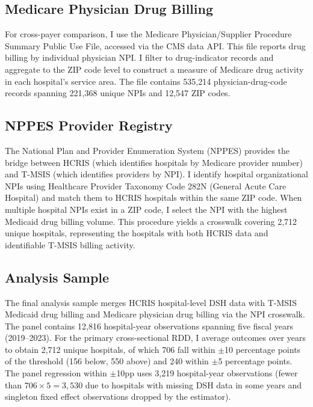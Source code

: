 \documentclass[12pt]{article}
\begin{document}
\subsection{Medicare Physician Drug Billing}

For cross-payer comparison, I use the Medicare Physician/Supplier Procedure Summary Public Use File, accessed via the CMS data API. This file reports drug billing by individual physician NPI. I filter to drug-indicator records and aggregate to the ZIP code level to construct a measure of Medicare drug activity in each hospital's service area. The file contains 535,214 physician-drug-code records spanning 221,368 unique NPIs and 12,547 ZIP codes.

\subsection{NPPES Provider Registry}

The National Plan and Provider Enumeration System (NPPES) provides the bridge between HCRIS (which identifies hospitals by Medicare provider number) and T-MSIS (which identifies providers by NPI). I identify hospital organizational NPIs using Healthcare Provider Taxonomy Code 282N (General Acute Care Hospital) and match them to HCRIS hospitals within the same ZIP code. When multiple hospital NPIs exist in a ZIP code, I select the NPI with the highest Medicaid drug billing volume. This procedure yields a crosswalk covering 2,712 unique hospitals, representing the hospitals with both HCRIS data and identifiable T-MSIS billing activity.

\subsection{Analysis Sample}

The final analysis sample merges HCRIS hospital-level DSH data with T-MSIS Medicaid drug billing and Medicare physician drug billing via the NPI crosswalk. The panel contains 12,816 hospital-year observations spanning five fiscal years (2019--2023). For the primary cross-sectional RDD, I average outcomes over years to obtain 2,712 unique hospitals, of which 706 fall within $\pm$10 percentage points of the threshold (156 below, 550 above) and 240 within $\pm$5 percentage points. The panel regression within $\pm$10pp uses 3,219 hospital-year observations (fewer than $706 \times 5 = 3{,}530$ due to hospitals with missing DSH data in some years and singleton fixed effect observations dropped by the estimator).
\end{document}
